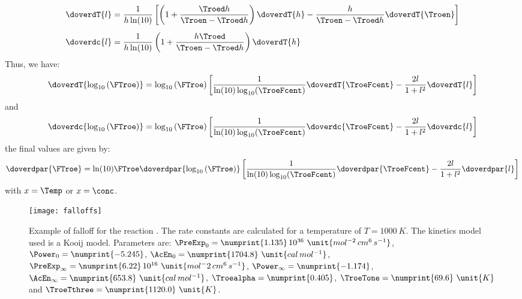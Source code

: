\begin{equation}
\begin{split}
\doverdT{l} & = \frac{1}{h \ln(10)}\left[\left(1 + \frac{\Troed h}{\Troen - \Troed h}\right) \doverdT{h} - \frac{h}{\Troen - \Troed h}\doverdT{\Troen} \right]  \\[5pt]
\doverdc{l} & = \frac{1}{h \ln(10)}\left(1 + \frac{h\Troed}{\Troen - \Troed h} \right)\doverdT{h}
\end{split}
\end{equation}
Thus, we have:
\begin{equation}
\doverdT{\log_{10}\left(\FTroe\right)} = \log_{10}\left(\FTroe\right) 
                           \left[
                                  \frac{1}{\ln(10)\log_{10}(\TroeFcent)}\doverdT{\TroeFcent}
                                - \frac{2 l}{1 + l^2} \doverdT{l}
                          \right]
\end{equation}
and
\begin{equation}
\doverdc{\log_{10}\left(\FTroe\right)} = \log_{10}\left(\FTroe\right)
                           \left[
                                  \frac{1}{\ln(10)\log_{10}(\TroeFcent)}\doverdc{\TroeFcent}
                                - \frac{2 l}{1 + l^2} \doverdc{l}
                          \right]
\end{equation}
the final values are given by:
\begin{equation}
\doverdpar{\FTroe} = \ln(10)\FTroe\doverdpar{\log_{10}\left(\FTroe\right)}
                           \left[
                                  \frac{1}{\ln(10)\log_{10}(\TroeFcent)}\doverdpar{\TroeFcent}
                                - \frac{2 l}{1 + l^2} \doverdpar{l}
                          \right]
\end{equation}
with $x = \Temp$ or $x = \conc$.
\begin{figure}
\centering
\texttt{[image: falloffs]}
\caption[Example of falloff reaction]{\label{kinetics::falloffs}%
Example of falloff for the reaction .
The rate constants are calculated for a temperature of $T = 1000~\unit{K}$. The kinetics model
used is a Kooij model. Parameters are:
$\PreExp_0      = \numprint{1.135}\,10^{36}~\unit{mol^{-2}\,cm^6\,s^{-1}}$,
$\Power_0       = \numprint{-5.245}$,
$\AcEn_0        = \numprint{1704.8}~\unit{cal\,mol^{-1}}$,
$\PreExp_\infty = \numprint{6.22}\,10^{16}~\unit{mol^-2\,cm^6\,s^{-1}}$,
$\Power_\infty  = \numprint{-1.174}$,
$\AcEn_\infty   = \numprint{653.8}~\unit{cal\,mol^{-1}}$,
$\Troealpha     = \numprint{0.405}$,
$\TroeTone      = \numprint{69.6}~\unit{K}$ and
$\TroeTthree    = \numprint{1120.0}~\unit{K}$.}
\end{figure}

